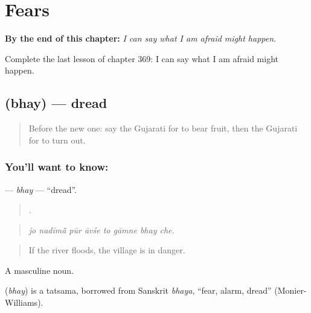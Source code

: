 
\chapter{Fears}
\label{ch:gu-fears}

\begin{chapteropening}
\textbf{By the end of this chapter:} \emph{I can say what I am afraid might happen.}

Complete the last lesson of chapter 369: I can say what I am afraid might happen.
\end{chapteropening}

\section[\texorpdfstring{\gu{ભય} (bhay)}{ભય (bhay)}]{ (bhay) — dread}

\label{lesson:GU-C369-bhay}



\begin{quote}
Before the new one: say the Gujarati for to bear fruit, then the Gujarati for to turn out.
\end{quote}

\subsection*{You'll want to know: }
\textbf{} — \emph{bhay} — \textquotedblleft{}dread\textquotedblright{}.

\begin{quote}
       .
\end{quote}

\begin{quote}
\emph{jo nadīmā̃ pūr āvśe to gāmne bhay che.}
\end{quote}

\begin{quote}
If the river floods, the village is in danger.
\end{quote}

A masculine noun.

\begin{cousinweb}
\textbf{} (\emph{bhay}) is a tatsama, borrowed from Sanskrit \emph{bhaya}, \textquotedblleft{}fear, alarm, dread\textquotedblright{} (Monier-Williams).
\end{cousinweb}

